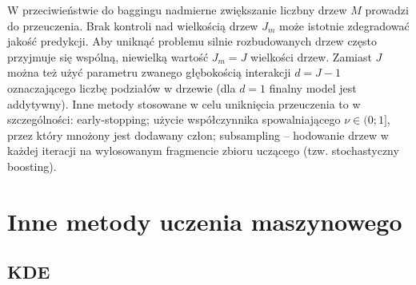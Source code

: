 \documentclass{myclass}
\begin{document}
W przeciwieństwie do baggingu nadmierne zwiększanie liczbny drzew $M$ prowadzi do przeuczenia. Brak
kontroli nad wielkością drzew $J_m$ może istotnie zdegradować jakość predykcji. Aby uniknąć problemu
silnie rozbudowanych drzew często przyjmuje się wspólną, niewielką wartość $J_m=J$ wielkości drzew.
Zamiast $J$ można też użyć parametru zwanego głębokością interakcji $d = J-1$ oznaczającego liczbę
podziałów w drzewie (dla $d=1$ finalny model jest addytywny). Inne metody stosowane w celu
uniknięcia przeuczenia to w szczególności: early-stopping; użycie współczynnika spowalniającego $\nu
\in (0;1]$, przez który mnożony jest dodawany człon; subsampling -- hodowanie drzew w każdej
iteracji na wylosowanym fragmencie zbioru uczącego (tzw. stochastyczny boosting).


\section{Inne metody uczenia maszynowego}

\subsection{KDE}
\end{document}
